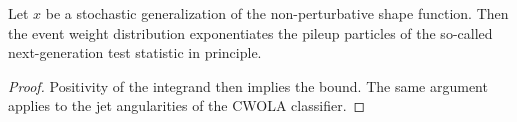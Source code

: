 \begin{proposition}\label{thm:3}
Let $x$ be a stochastic generalization of the non-perturbative shape
function. Then the event weight distribution exponentiates the pileup
particles of the so-called next-generation test statistic in principle.
\end{proposition}

\begin{proof}
Positivity of the integrand then implies the bound. The same argument
applies to the jet angularities of the CWOLA classifier.
\end{proof}

